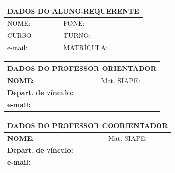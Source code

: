 \documentclass[12pt,openright,oneside,a4paper,ruledheader,pnumromarab,english]{abntex2}
\begin{document}
\begin{table}[!htb]
\begin{tabular}{|l|l|l|l|}
\hline
\multicolumn{4}{|c|}{\textbf{DADOS DO ALUNO-REQUERENTE}} \\ \hline
NOME:         &  \hspace{7cm}      & FONE:           &    \hspace{3cm}           \\ \hline
CURSO:        &        & TURNO:          &      \\ \hline
e-mail:       &        & MATRÍCULA:      &               \\ \hline
\end{tabular}
\end{table}

\vspace{-0.5cm}
\begin{table}[!htb]
\begin{tabular}{|l|l|l|l|}
\hline
\multicolumn{4}{|c|}{\textbf{DADOS DO PROFESSOR ORIENTADOR}}                   \\ \hline
\textbf{NOME:}                           & \hspace{6cm} & Mat. SIAPE:& \hspace{1.8cm} \textbf{} \\ \hline
\textbf{Depart. de vínculo:}& \multicolumn{3}{l|}{}               \\ \hline
\textbf{e-mail:}                         & \multicolumn{3}{l|}{}               \\ \hline
\end{tabular}
\end{table}

\vspace{-0.5cm}
\begin{table}[!htb]
\begin{tabular}{|l|l|l|l|}
\hline
\multicolumn{4}{|c|}{\textbf{DADOS DO PROFESSOR COORIENTADOR}}        \\ \hline
\textbf{NOME:}                           & \hspace{6cm} & Mat. SIAPE:& \hspace{1.8cm} \textbf{} \\ \hline
\textbf{Depart. de vínculo:}& \multicolumn{3}{l|}{}               \\ \hline
\textbf{e-mail:}                         & \multicolumn{3}{l|}{}               \\ \hline
\end{tabular}
\end{table}
\end{document}

